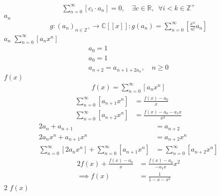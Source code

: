 \documentclass{article}
\begin{document}
\begin{align}
\sum^{\infty}_{n= 0}   \left[ c_i \cdot  a_n \right] = 0, \quad \exists c \in
\mathbb{R}, \enspace \forall i<k\in\mathbb{Z}^+ \label{eq:recurrence-relation-def}
\end{align}
$a_n$
\begin{align}
g: \left( a_n \right)_{n\in\mathbb{Z}^+} \rightarrow \mathbb{C}\left[ \left[ x \right]  \right]: g\left( a_n \right) = \sum^{\infty}_{n= 0}\left[ \frac{x^n}{n!} a_n \right] \label{eq:gen-func-def}
\end{align}
$a_n$
$\sum^\infty_{n = 0}
\left[ a_nx^n \right]$
\begin{align*}
a_0= 1 \\
a_0= 1 \\
a_{n+  2} =  a_{n+  1 +  2 a_n}, \quad n \geq 0
\end{align*}
$f(x)$
\begin{align}
f\left( x \right)= \sum^{\infty}_{n= 0}   \left[ a_nx^n \right] \label{eq:pow-gen-func-np0}
\end{align}
\begin{align}
    \sum^{\infty}_{n= 0}  \left[ a_{n+  1} x^n \right] &= \frac{f\left( x \right)- a_0}{x} \label{eq:pow-gen-func-np1} \\
\sum^{\infty}_{n= 0}  \left[ a_{n+  2} x^n \right]  &= \frac{f\left( x \right) - a_0 - a_1x}{x^2} \label{eq:pow-gen-func-np2}
\end{align}
\begin{align}
    2a_n +  a_{n+  1 }&= a_{n+  2} \nonumber \\
    2a_nx^n +  a_{n+  1 } x^n &= a_{n+  2} x^n \nonumber \\
    \sum^{\infty}_{n= 0}   \left[ 2a_nx^n \right] + \sum^{\infty}_{n= 0}   \left[  a_{n+  1 } x^n  \right]   &= \sum^{\infty}_{n= 0}   \left[ a_{n+  2} x^n   \right] \label{eq:series-rep-pow-example}
\end{align}
\begin{align}
2f\left( x \right) +  \frac{f\left( x \right)- a_0}{x} &= \frac{f\left( x \right)- a_0}{- a_1x}x^2 \nonumber \\
\implies  f\left( x \right) &=  \frac{1}{1- x- x^2} \label{eq:power-series-form-example}
\end{align}
$2$
$f(x)$
\end{document}
